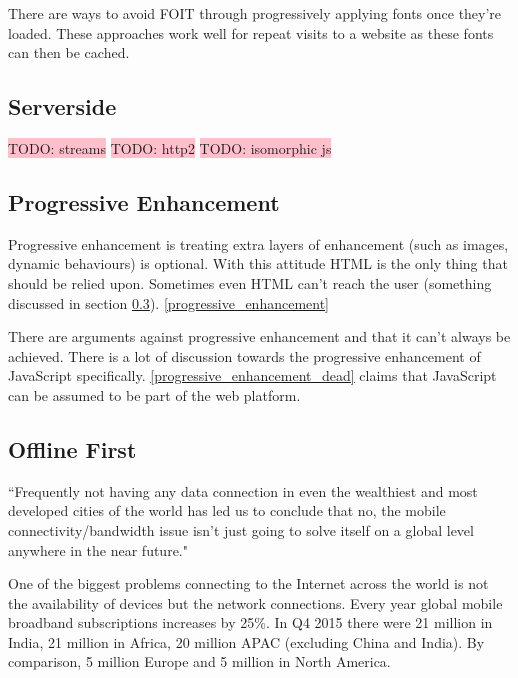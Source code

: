 There are ways to avoid FOIT through progressively applying fonts once they're loaded. These approaches work well for repeat visits to a website as these fonts can then be cached. \cite{FOIT}

\subsection{Serverside} \label{l-r--serverside}

\colorbox{pink}{TODO: streams}
\colorbox{pink}{TODO: http2}
\colorbox{pink}{TODO: isomorphic js}


\subsection{Progressive Enhancement} \label{l-r--progressive-enhancement}

Progressive enhancement is treating extra layers of enhancement (such as images, dynamic behaviours) is optional. With this attitude HTML is the only thing that should be relied upon. Sometimes even HTML can't reach the user (something discussed in section \ref{l-r--offline-first}). \ref{progressive_enhancement}

There are arguments against progressive enhancement and that it can't always be achieved. There is a lot of discussion towards the progressive enhancement of JavaScript specifically. \ref{progressive_enhancement_dead} claims that JavaScript can be assumed to be part of the web platform.

\subsection{Offline First} \label{l-r--offline-first}

``Frequently not having any data connection in even the wealthiest and most developed cities of the world has led us to conclude that no, the mobile connectivity/bandwidth issue isn’t just going to solve itself on a global level anywhere in the near future." \cite{hello_to_offline_first}

One of the biggest problems connecting to the Internet across the world is not the availability of devices but the network connections. Every year global mobile broadband subscriptions increases by 25\%. In Q4 2015 there were 21 million in India, 21 million in Africa, 20 million APAC (excluding China and India). By comparison, 5 million Europe and 5 million in North America. \cite{ericsson}

